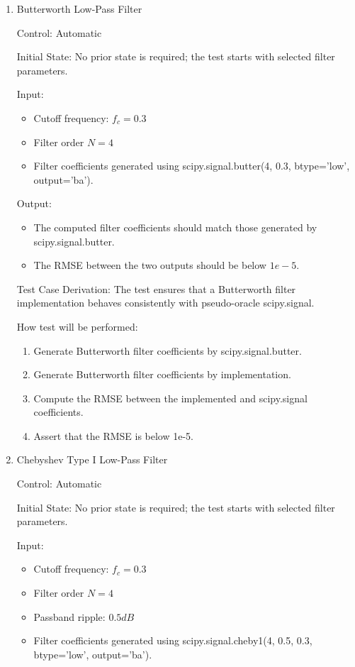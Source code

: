 \documentclass[12pt, titlepage]{article}
\begin{document}
\begin{enumerate}

  \item{Butterworth Low-Pass Filter\\}
  
  Control: Automatic
            
  Initial State: No prior state is required; the test starts with selected
  filter parameters.
            
  Input:
  \begin{itemize}
    \item Cutoff frequency: $f_c=0.3$
    \item Filter order $N=4$
    \item Filter coefficients generated using scipy.signal.butter(4, 0.3,
    btype='low', output='ba').
  \end{itemize}
  
  Output:
  \begin{itemize}
    \item The computed filter coefficients should match those generated by
    scipy.signal.butter.
    \item The RMSE between the two outputs should be below $1e-5$.
  \end{itemize}
  
  Test Case Derivation: The test ensures that a Butterworth filter
  implementation behaves consistently with pseudo-oracle scipy.signal.
            
  How test will be performed: 
  \begin{enumerate}
    \item Generate Butterworth filter coefficients by scipy.signal.butter.
    \item Generate Butterworth filter coefficients by implementation.
    \item Compute the RMSE between the implemented and scipy.signal
    coefficients.
    \item Assert that the RMSE is below 1e-5.
  \end{enumerate}
            
  \item{Chebyshev Type I Low-Pass Filter\\}
  
  Control: Automatic
            
  Initial State: No prior state is required; the test starts with selected
  filter parameters.
            
  Input:
  \begin{itemize}
    \item Cutoff frequency: $f_c=0.3$
    \item Filter order $N=4$
    \item Passband ripple: $0.5 dB$
    \item Filter coefficients generated using scipy.signal.cheby1(4, 0.5, 0.3,
    btype='low', output='ba').
  \end{itemize}
  

\end{enumerate}
\end{document}
